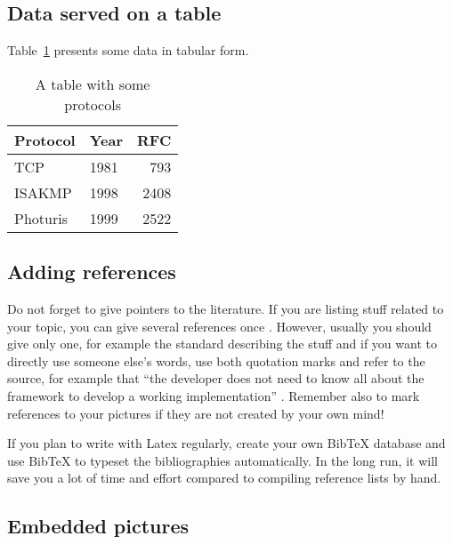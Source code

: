 \documentclass{cseminar}
\begin{document}
\subsection{Data served on a table}


Table~\ref{tab:mytable1} presents some data in tabular form. 

\begin{table}[t]
  \begin{center}
    \begin{tabular}{|l|lr|}
    \hline
    Protocol & Year &  RFC \\
    \hline
    TCP      & 1981 &  793 \\
    ISAKMP   & 1998 & 2408 \\
    Photuris & 1999 & 2522 \\
    \hline
    \end{tabular}
    \caption{A table with some protocols}
    \label{tab:mytable1}
  \end{center}
\end{table}




\subsection{Adding references}
\label{sec:references}

Do not forget to give pointers to the literature. If you are listing
stuff related to your topic, you can give several references once
\cite{Com00,HTS03,Nik99}. However, usually you should give only one, for example the standard describing the stuff \cite{RFC2408} and if you want to directly use someone else's words, use both quotation marks and refer to the source, for example that ``the developer does not need to know all about the framework to develop a working implementation'' \cite{Suo98}. Remember also to mark references to your pictures if they are not created by your own mind!

If you plan to write with Latex regularly, create your own BibTeX
database and use BibTeX to typeset the bibliographies automatically.
In the long run, it will save you a lot of time and effort compared to
compiling reference lists by hand.




\subsection{Embedded pictures}
\label{sec:pictures}
\end{document}
